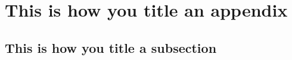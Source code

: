 \begin{appendices}
\chapter{}
\label{appendix:text}


\chapter{This is how you title an appendix}
\label{appendix:text1}

\section{This is how you title a subsection}

\end{appendices}